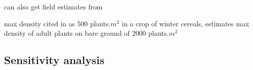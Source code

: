 \documentclass[12pt, a4paper]{article}
\begin{document}
can also get field estimates from \cite{Cava1999}

max density cited in \cite{Doyl1986} as 500 plants$.m^2$ in a crop of winter cereals, \cite{Colb2007} estimates max density of adult plants on bare ground of 2000 plants$.m^2$  

\subsection{Sensitivity analysis}





 

\end{document}
